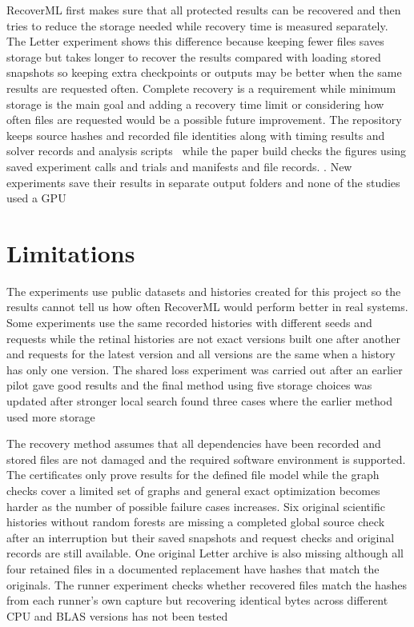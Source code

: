 RecoverML first makes sure that all protected results can be recovered and then tries to reduce the storage needed while recovery time is measured separately. The Letter experiment shows this difference because keeping fewer files saves storage but takes longer to recover the results compared with loading stored snapshots so keeping extra checkpoints or outputs may be better when the same results are requested often. Complete recovery is a requirement while minimum storage is the main goal and adding a recovery time limit or considering how often files are requested would be a possible future improvement. The repository keeps source hashes and recorded file identities along with timing results and solver records and analysis scripts~\cite{artifact} while the paper build checks the figures using saved experiment calls and trials and manifests and file records. . New experiments save their results in separate output folders and none of the studies used a GPU

\section{Limitations}

The experiments use public datasets and histories created for this project so the results cannot tell us how often RecoverML would perform better in real systems. Some experiments use the same recorded histories with different seeds and requests while the retinal histories are not exact versions built one after another and requests for the latest version and all versions are the same when a history has only one version. The shared loss experiment was carried out after an earlier pilot gave good results and the final method using five storage choices was updated after stronger local search found three cases where the earlier method used more storage

The recovery method assumes that all dependencies have been recorded and stored files are not damaged and the required software environment is supported. The certificates only prove results for the defined file model while the graph checks cover a limited set of graphs and general exact optimization becomes harder as the number of possible failure cases increases. Six original scientific histories without random forests are missing a completed global source check after an interruption but their saved snapshots and request checks and original records are still available. One original Letter archive is also missing although all four retained files in a documented replacement have hashes that match the originals. The runner experiment checks whether recovered files match the hashes from each runner's own capture but recovering identical bytes across different CPU and BLAS versions has not been tested

